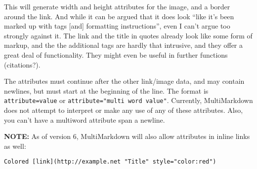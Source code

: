 This will generate width and height attributes for the image, and a border
around the link. And while it can be argued that it does look ``like it's been
marked up with tags {[and]} formatting instructions'', even I can't argue too
strongly against it. The link and the title in quotes already look like some
form of markup, and the the additional tags are hardly that intrusive, and
they offer a great deal of functionality. They might even be useful in further
functions (citations?).

The attributes must continue after the other link\slash image data, and may contain
newlines, but must start at the beginning of the line. The format is
\texttt{attribute=value} or \texttt{attribute="multi word value"}. Currently, MultiMarkdown
does not attempt to interpret or make any use of any of these attributes.
Also, you can't have a multiword attribute span a newline.

\textbf{NOTE:} As of version 6, MultiMarkdown will also allow attributes in inline links as well:

\begin{verbatim}
Colored [link](http://example.net "Title" style="color:red")
\end{verbatim}



